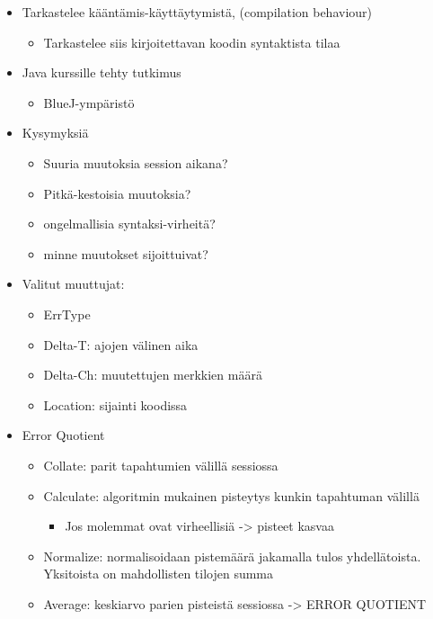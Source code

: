 \documentclass[finnish,twoside,openright]{HYgraduMLDS}
\begin{document}
\begin{itemize}
    \item Tarkastelee kääntämis-käyttäytymistä, (compilation behaviour)
    \begin{itemize}
        \item Tarkastelee siis kirjoitettavan koodin syntaktista tilaa
    \end{itemize}
    \item Java kurssille tehty tutkimus
    \begin{itemize}
        \item BlueJ-ympäristö
    \end{itemize}
    \item Kysymyksiä
    \begin{itemize}
        \item Suuria muutoksia session aikana?
        \item Pitkä-kestoisia muutoksia?
        \item ongelmallisia syntaksi-virheitä?
        \item minne muutokset sijoittuivat?
    \end{itemize}
    \item Valitut muuttujat:
    \begin{itemize}
        \item ErrType
        \item Delta-T: ajojen välinen aika
        \item Delta-Ch: muutettujen merkkien määrä
        \item Location: sijainti koodissa
    \end{itemize}
    \item Error Quotient
    \begin{itemize}
        \item Collate: parit tapahtumien välillä sessiossa
        \item Calculate: algoritmin mukainen pisteytys kunkin tapahtuman välillä
        \begin{itemize}
            \item Jos molemmat ovat virheellisiä -> pisteet kasvaa
        \end{itemize}
        \item Normalize: normalisoidaan pistemäärä jakamalla tulos yhdellätoista. Yksitoista on mahdollisten tilojen summa
        \item Average: keskiarvo parien pisteistä sessiossa -> ERROR QUOTIENT
    \end{itemize}

\end{itemize}
\end{document}
